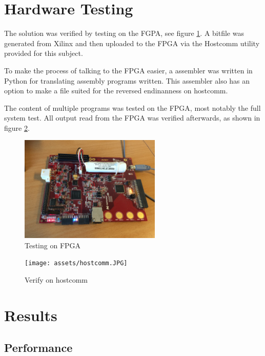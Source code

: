 \section{Hardware Testing}

The solution was verified by testing on the FGPA, see figure \ref{fig:testing_on_fpga}.
A bitfile was generated from Xilinx and then uploaded to the FPGA via the Hostcomm utility \cite{hostcomm} provided for this subject. 

To make the process of talking to the FPGA easier, a assembler was written in Python for translating assembly programs written.
This assembler also has an option to make a file suited for the reversed endinanness on hostcomm.

The content of multiple programs was tested on the FPGA, most notably the full system test.
All output read from the FPGA was verified afterwards, as shown in figure \ref{fig:verify_hostcomm}.

\begin{figure}[H]
  \begin{center}
    \includegraphics[width=0.60\textwidth]{assets/FPGA.JPG}
  \end{center}
  \caption{Testing on FPGA}
  \label{fig:testing_on_fpga}
\end{figure}

\begin{figure}[H]
  \begin{center}
    \texttt{[image: assets/hostcomm.JPG]}
  \end{center}
  \caption{Verify on hostcomm}
  \label{fig:verify_hostcomm}
\end{figure}


\section{Results}

\subsection{Performance}

